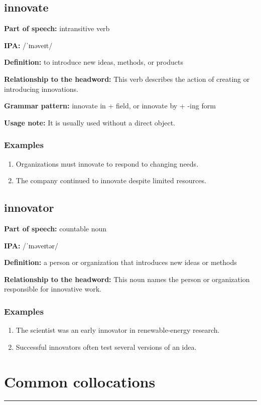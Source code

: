 \documentclass[11pt]{article}
\newcommand{\sectionrule}{\par\vspace{-0.5em}\noindent\textcolor{Accent}{\rule{\linewidth}{0.6pt}}\par}
\begin{document}
\subsection{innovate}
\textbf{Part of speech:} intransitive verb

\textbf{IPA:} /ˈɪnəveɪt/

\textbf{Definition:} to introduce new ideas, methods, or products

\textbf{Relationship to the headword:} This verb describes the action of creating or introducing innovations.

\textbf{Grammar pattern:} innovate in + field, or innovate by + -ing form

\textbf{Usage note:} It is usually used without a direct object.

\subsubsection{Examples}
\begin{enumerate}
  \item Organizations must innovate to respond to changing needs.
  \item The company continued to innovate despite limited resources.
\end{enumerate}

\subsection{innovator}
\textbf{Part of speech:} countable noun

\textbf{IPA:} /ˈɪnəveɪtər/

\textbf{Definition:} a person or organization that introduces new ideas or methods

\textbf{Relationship to the headword:} This noun names the person or organization responsible for innovative work.

\subsubsection{Examples}
\begin{enumerate}
  \item The scientist was an early innovator in renewable-energy research.
  \item Successful innovators often test several versions of an idea.
\end{enumerate}

\section{Common collocations}
\sectionrule
\end{document}

